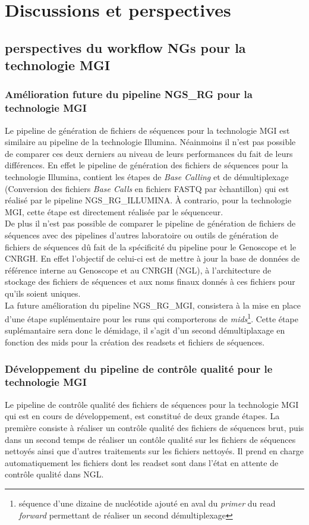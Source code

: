 \section{Discussions et perspectives}
\subsection{perspectives du workflow NGs pour la technologie MGI}

\subsubsection{Amélioration future du pipeline NGS\_RG pour la technologie MGI}
Le pipeline de génération de fichiers de séquences pour la technologie MGI est similaire au pipeline de la technologie Illumina. Néainmoins il n'est pas possible de comparer ces deux derniers au niveau de leurs performances du fait de leurs différences. En effet le pipeline de génération des fichiers de séquences pour la technologie Illumina, contient les étapes de \emph{Base Calling} et de démultiplexage (Conversion des fichiers \emph{Base Calls} en fichiers FASTQ par èchantillon) qui est réalisé par le pipeline NGS\_RG\_ILLUMINA. À contrario, pour la technologie MGI, cette étape est directement réalisée par le séquenceur.\\
De plus il n'est pas possible de comparer le pipeline de génération de fichiers de séquences avec des pipelines d'autres laboratoire ou outils de génération de fichiers de séquences dû fait de la spécificité du pipeline pour le Genoscope et le CNRGH. En effet l'objectif de celui-ci est de mettre à jour la base de données de référence interne au Genoscope et au CNRGH (NGL), à l'architecture de stockage des fichiers de séquences et aux noms finaux donnés à ces fichiers pour qu'ils soient uniques.\\

La future amélioration du pipeline NGS\_RG\_MGI, consistera à la mise en place d'une étape suplémentaire pour les runs qui comporterons de \emph{mids}\footnote{séquence d'une dizaine de nucléotide ajouté en aval du \emph{primer} du read \emph{forward} permettant de réaliser un second démultiplexage}. Cette étape suplémantaire sera donc le démidage, il s'agit d'un second démultiplaxage en fonction des mids pour la création des readsets et fichiers de séquences.


\subsubsection{Développement du pipeline de contrôle qualité pour le technologie MGI}
Le pipeline de contrôle qualité des fichiers de séquences pour la technologie MGI qui est en cours de développement, est constitué de deux grande étapes. La première consiste à réaliser un contrôle qualité des fichiers de séquences brut, puis dans un second temps de réaliser un contôle qualité sur les fichiers de séquences nettoyés ainsi que d'autres traitements sur les fichiers nettoyés. Il prend en charge automatiquement les fichiers dont les readset sont dans l'état \og en attente de contrôle qualité\fg{} dans NGL.\\

